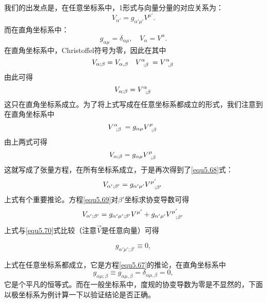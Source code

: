 我们的出发点是，在任意坐标系中，1形式与向量分量的对应关系为：
\begin{equation}
    V_{\alpha'} = g_{\alpha' \mu'} V^{\mu'}.
\label{equ5.69}
\end{equation}
而在直角坐标系中：
\begin{equation*}
    g_{\alpha \mu} = \delta_{\alpha \mu}, \quad V_{\alpha} = V^\alpha.
\end{equation*}
在直角坐标系中，Christoffel符号为零，因此在其中
\begin{equation*}
    V_{\alpha; \beta} = V_{\alpha, \beta}\quad V\indices{^\alpha_{; \beta}} = V\indices{^\alpha_{, \beta}}
\end{equation*}
由此可得
\[
    V_{\alpha; \beta} = V\indices{^\alpha_{; \beta}}
\]
这只在直角坐标系成立。为了将上式写成在任意坐标系都成立的形式，我们注意到在直角坐标系中
\begin{equation*}
    V\indices{^\alpha_{; \beta}} = g_{\alpha \mu} V\indices{^\mu_{; \beta}}
\end{equation*}
由上两式可得
\[
    V_{\alpha; \beta} = g_{\alpha \mu} V\indices{^\mu_{; \beta}}
\]
这就写成了张量方程，在所有坐标系成立，于是再次得到了\eqref{equ5.68}式：
\begin{equation}
    V_{\alpha'; \beta'} = g_{\alpha' \mu'} V\indices{^{\mu'}_{; \beta'}}
\label{equ5.70}
\end{equation}
上式有个重要推论。方程\eqref{equ5.69}对$\beta'$坐标求协变导数可得
\[
    V_{\alpha'; \beta'} = g_{\alpha' \mu'; \beta'} V^{\mu'} + g_{\alpha' \mu'} V\indices{^{\mu'}_{; \beta'}}    
\]
上式与\eqref{equ5.70}式比较（注意$\vec{V}$是任意向量）可得
\begin{shaded}
\begin{equation}
    g_{\alpha' \mu'; \beta'} \equiv 0,
\label{equ5.71}
\end{equation}
\end{shaded}
上式在任意坐标系都成立，它是方程\eqref{equ5.67}的推论，在直角坐标系中
\[
    g_{\alpha \mu; \beta} \equiv g_{\alpha \mu, \beta} = \delta_{\alpha \mu, \beta} = 0,
\]
它是个平凡的恒等式。而在一般坐标系中，度规的协变导数为零是不显然的，下面以极坐标系为例计算一下以验证结论是否正确。

